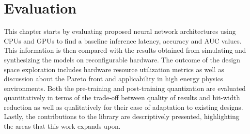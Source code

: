 \chapter{Evaluation}\label{evaluation}
This chapter starts by evaluating proposed neural network architectures using CPUs and GPUs to find a baseline inference latency, accuracy and AUC values. This information is then compared with the results obtained from simulating and synthesizing the models on reconfigurable hardware. The outcome of the design space exploration includes hardware resource utilization metrics as well as discussion about the Pareto front and applicability in high energy physics environments. Both the pre-training and post-training quantization are evaluated quantitatively in terms of the trade-off between quality of results and bit-width reduction as well as qualitatively for their ease of adaptation to existing designs. Lastly, the contributions to the \hlsml library are descriptively presented, highlighting the areas that this work expands upon.





